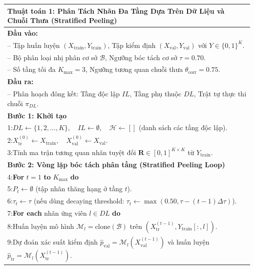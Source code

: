 \documentclass[11pt,a4paper]{article}
\begin{document}
\begin{table}[H]
\centering
\small
\begin{tabular}{p{}}
\toprule
\textbf{Thuật toán 1: Phân Tách Nhãn Đa Tầng Dựa Trên Dữ Liệu và Chuỗi Thưa (Stratified Peeling)}\label{alg:stratified_peeling} \\
\midrule
\textbf{Đầu vào:} \\
\quad -- Tập huấn luyện $(X_{\text{train}}, Y_{\text{train}})$, Tập kiểm định $(X_{\text{val}}, Y_{\text{val}})$ với $Y \in \{0, 1\}^K$. \\
\quad -- Bộ phân loại nhị phân cơ sở $\mathcal{B}$, Ngưỡng bóc tách cơ sở $\tau = 0.70$. \\
\quad -- Số tầng tối đa $K_{\max} = 3$, Ngưỡng tương quan chuỗi thưa $\theta_{\text{corr}} = 0.75$. \\
\textbf{Đầu ra:} \\
\quad -- Phân hoạch đông kết: Tầng độc lập $IL$, Tầng phụ thuộc $DL$, Trật tự thực thi chuỗi $\pi_{DL}$. \\
\midrule
\textbf{Bước 1: Khởi tạo} \\
1:\quad $DL \leftarrow \{1, 2, \dots, K\}, \quad IL \leftarrow \emptyset, \quad \mathcal{H} \leftarrow []$ (danh sách các tầng độc lập). \\
2:\quad $X_{\text{tr}}^{(0)} \leftarrow X_{\text{train}}, \quad X_{\text{val}}^{(0)} \leftarrow X_{\text{val}}$. \\
3:\quad Tính ma trận tương quan nhãn tuyệt đối $\mathbf{R} \in [0, 1]^{K \times K}$ từ $Y_{\text{train}}$. \\
\addlinespace
\textbf{Bước 2: Vòng lặp bóc tách phân tầng (Stratified Peeling Loop)} \\
4:\quad \textbf{For} $t = 1$ \textbf{to} $K_{\max}$ \textbf{do} \\
5:\quad\quad $P_t \leftarrow \emptyset$ \quad (tập nhãn thăng hạng ở tầng $t$). \\
6:\quad\quad $\tau_t \leftarrow \tau$ \quad (nếu dùng decaying threshold: $\tau_t \leftarrow \max(0.50, \tau - (t-1)\Delta\tau)$). \\
7:\quad\quad \textbf{For each} nhãn ứng viên $l \in DL$ \textbf{do} \\
8:\quad\quad\quad Huấn luyện mô hình $\mathcal{M}_l = \text{clone}(\mathcal{B})$ trên $(X_{\text{tr}}^{(t-1)}, Y_{\text{train}}[:, l])$. \\
9:\quad\quad\quad Dự đoán xác suất kiểm định $\hat{p}_{\text{val}} = \mathcal{M}_l(X_{\text{val}}^{(t-1)})$ và huấn luyện $\hat{p}_{\text{tr}} = \mathcal{M}_l(X_{\text{tr}}^{(t-1)})$. \\

\end{tabular}
\end{table}
\end{document}

